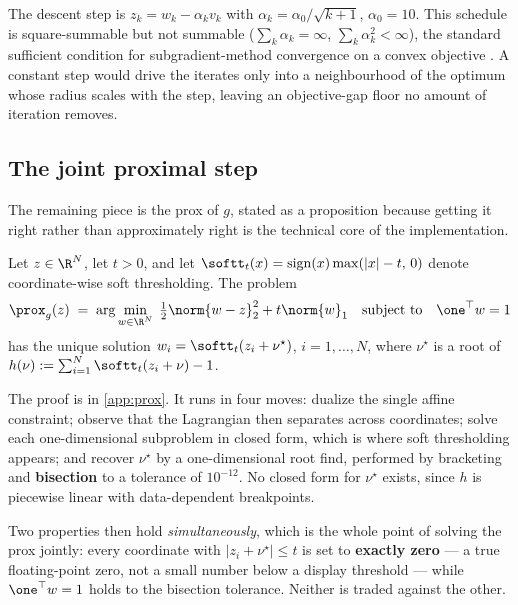 The descent step is $z_k = w_k - \alpha_k v_k$ with $\alpha_k = \alpha_0/\sqrt{k+1}$,
$\alpha_0 = 10$. This schedule is square-summable but not summable
($\sum_k\alpha_k = \infty$, $\sum_k\alpha_k^2 < \infty$), the standard sufficient condition for
subgradient-method convergence on a convex objective \citep{boyd2004}. A constant step would
drive the iterates only into a neighbourhood of the optimum whose radius scales with the step,
leaving an objective-gap floor no amount of iteration removes.

\subsection{The joint proximal step}

The remaining piece is the prox of $g$, stated as a proposition because getting it right rather
than approximately right is the technical core of the implementation.

\begin{proposition}\label{prop:jointprox}
Let $z \in \R^N$, let $t > 0$, and let
$\softt_t(x) = \operatorname{sign}(x)\max(|x| - t,\, 0)$ denote coordinate-wise soft
thresholding. The problem
\[
  \prox_{g}(z) \;=\; \arg\min_{w \in \R^N}\;
    \tfrac{1}{2}\norm{w - z}_2^2 + t\norm{w}_1
    \quad \text{subject to} \quad \one^\top w = 1
\]
has the unique solution $w_i = \softt_t(z_i + \nu^\star)$, $i = 1,\dots,N$, where $\nu^\star$
is a root of $h(\nu) := \sum_{i=1}^{N} \softt_t(z_i + \nu) - 1$.
\end{proposition}

The proof is in \cref{app:prox}. It runs in four moves: dualize the single affine constraint;
observe that the Lagrangian then separates across coordinates; solve each one-dimensional
subproblem in closed form, which is where soft thresholding appears; and recover $\nu^\star$ by
a one-dimensional root find, performed by bracketing and \textbf{bisection} to a tolerance of
$10^{-12}$. No closed form for $\nu^\star$ exists, since $h$ is piecewise linear with
data-dependent breakpoints.

Two properties then hold \emph{simultaneously}, which is the whole point of solving the prox
jointly: every coordinate with $|z_i + \nu^\star| \le t$ is set to \textbf{exactly zero} --- a
true floating-point zero, not a small number below a display threshold --- while
$\one^\top w = 1$ holds to the bisection tolerance. Neither is traded against the other.

